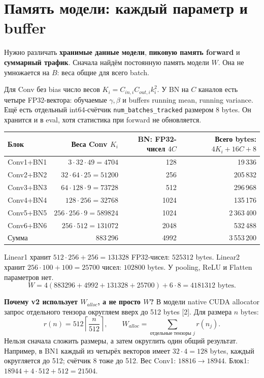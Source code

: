 \documentclass[11pt,a4paper]{article}
\newcommand{\bytes}{\text{ bytes}}
\newcommand{\page}[1]{\clearpage\section{#1}}
\begin{document}
\page{Память модели: каждый параметр и buffer}
Нужно различать \textbf{хранимые данные модели}, \textbf{пиковую память forward}
и \textbf{суммарный трафик}. Сначала найдём постоянную память модели $W$.
Она не умножается на $B$: веса общие для всего batch.

Для Conv без bias число весов $K_i=C_{in,i}C_{out,i}k_i^2$.
У BN на $C$ каналов есть четыре FP32-вектора: обучаемые $\gamma,\beta$
и buffers running mean, running variance. Ещё есть отдельный int64-счётчик
\texttt{num\_batches\_tracked} размером 8 bytes. Он хранится и в eval,
хотя статистика при forward не обновляется.

\begin{center}\small
\begin{tabular}{lrrr}
\toprule
Блок & Веса Conv $K_i$ & BN: FP32-чисел $4C$ & Всего bytes: $4K_i+16C+8$ \\
\midrule
Conv1+BN1 & $3\cdot32\cdot49=4704$ & 128 & 19\,336 \\
Conv2+BN2 & $32\cdot64\cdot25=51200$ & 256 & 205\,832 \\
Conv3+BN3 & $64\cdot128\cdot9=73728$ & 512 & 296\,968 \\
Conv4+BN4 & $128\cdot256=32768$ & 1024 & 135\,176 \\
Conv5+BN5 & $256\cdot256\cdot9=589824$ & 1024 & 2\,363\,400 \\
Conv6+BN6 & $256\cdot512=131072$ & 2048 & 532\,488 \\
\midrule
Сумма & 883\,296 & 4992 & 3\,553\,200 \\
\bottomrule
\end{tabular}\end{center}

Linear1 хранит $512\cdot256+256=131328$ FP32-чисел:
$525312$ bytes. Linear2 хранит $256\cdot100+100=25700$ чисел:
$102800$ bytes. У pooling, ReLU и Flatten параметров нет.
\[
 \boxed{W=4(883296+4992+131328+25700)+6\cdot8=4181312\bytes.}
\]

\textbf{Почему v2 использует $W_{alloc}$, а не просто $W$?}
В модели native CUDA allocator запрос отдельного тензора округляем вверх
до 512 bytes [2]. Для размера $n$ bytes:
\[
 r(n)=512\left\lceil\frac{n}{512}\right\rceil,\qquad
 W_{alloc}=\sum_{\text{отдельные тензоры }j}r(n_j).
\]
Нельзя сначала сложить размеры, а затем округлить один общий результат.
Например, в BN1 каждый из четырёх векторов имеет $32\cdot4=128$ bytes,
каждый округляется до 512; счётчик $8$ тоже до 512.
Вес Conv1: $18816\to18944$. Блок1: $18944+4\cdot512+512=21504$.
\end{document}
